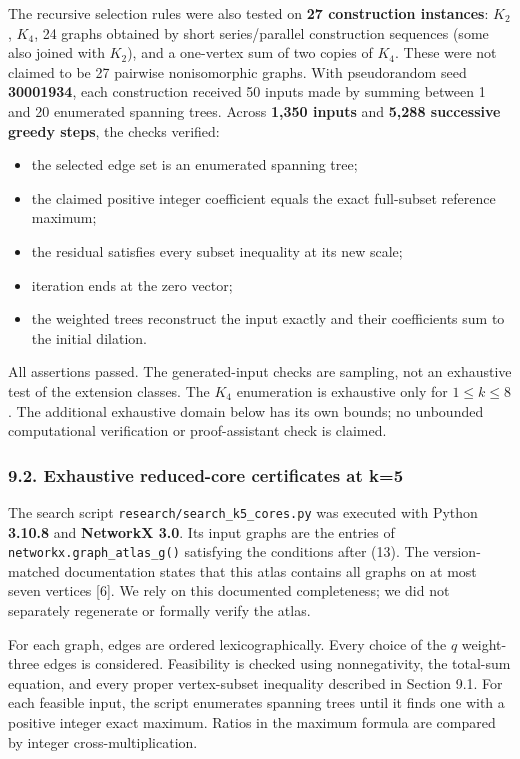 \documentclass{article}
\begin{document}
The recursive selection rules were also tested on \textbf{27 construction instances}: \(K_2\), \(K_4\), 24 graphs obtained by short series/parallel construction sequences (some also joined with \(K_2\)), and a one-vertex sum of two copies of \(K_4\). These were not claimed to be 27 pairwise nonisomorphic graphs. With pseudorandom seed \textbf{30001934}, each construction received 50 inputs made by summing between 1 and 20 enumerated spanning trees. Across \textbf{1,350 inputs} and \textbf{5,288 successive greedy steps}, the checks verified:

\begin{itemize}
\item
  the selected edge set is an enumerated spanning tree;
\item
  the claimed positive integer coefficient equals the exact full-subset reference maximum;
\item
  the residual satisfies every subset inequality at its new scale;
\item
  iteration ends at the zero vector;
\item
  the weighted trees reconstruct the input exactly and their coefficients sum to the initial dilation.
\end{itemize}

All assertions passed. The generated-input checks are sampling, not an exhaustive test of the extension classes. The \(K_4\) enumeration is exhaustive only for \(1\le k\le8\). The additional exhaustive domain below has its own bounds; no unbounded computational verification or proof-assistant check is claimed.

\subsubsection{9.2. Exhaustive reduced-core certificates at k=5}

The search script \texttt{research/search\_k5\_cores.py} was executed with Python \textbf{3.10.8} and \textbf{NetworkX 3.0}. Its input graphs are the entries of \texttt{networkx.graph\_atlas\_g()} satisfying the conditions after (13). The version-matched documentation states that this atlas contains all graphs on at most seven vertices [6]. We rely on this documented completeness; we did not separately regenerate or formally verify the atlas.

For each graph, edges are ordered lexicographically. Every choice of the \(q\) weight-three edges is considered. Feasibility is checked using nonnegativity, the total-sum equation, and every proper vertex-subset inequality described in Section 9.1. For each feasible input, the script enumerates spanning trees until it finds one with a positive integer exact maximum. Ratios in the maximum formula are compared by integer cross-multiplication.
\end{document}
